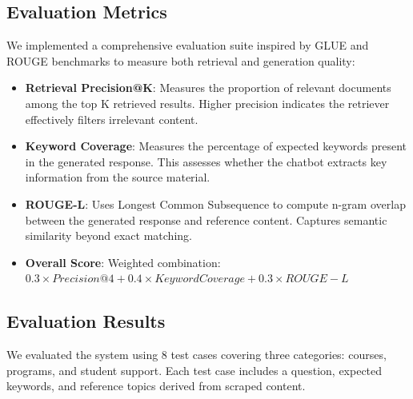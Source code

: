 \documentclass[conference]{IEEEtran}
\begin{document}
\subsection{Evaluation Metrics}
We implemented a comprehensive evaluation suite inspired by GLUE and ROUGE benchmarks to measure both retrieval and generation quality:

\begin{itemize}
    \item \textbf{Retrieval Precision@K}: Measures the proportion of relevant documents among the top K retrieved results. Higher precision indicates the retriever effectively filters irrelevant content.
    
    \item \textbf{Keyword Coverage}: Measures the percentage of expected keywords present in the generated response. This assesses whether the chatbot extracts key information from the source material.
    
    \item \textbf{ROUGE-L}: Uses Longest Common Subsequence to compute n-gram overlap between the generated response and reference content. Captures semantic similarity beyond exact matching.
    
    \item \textbf{Overall Score}: Weighted combination: $0.3 \times Precision@4 + 0.4 \times KeywordCoverage + 0.3 \times ROUGE-L$
\end{itemize}

\subsection{Evaluation Results}
We evaluated the system using 8 test cases covering three categories: courses, programs, and student support. Each test case includes a question, expected keywords, and reference topics derived from scraped content.
\end{document}
